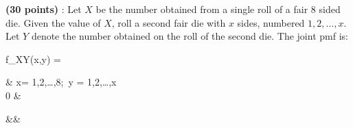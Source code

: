 \documentclass[12pt,letterpaper]{exam}
\begin{document}
\begin{questions}
	\question 
	\textbf{(30 points)} : Let \(X\) be the number obtained from a single roll of a fair 8 sided die.
	Given the value of \(X\), roll a second fair die with \(x\) sides, numbered \(1,2,\ldots,x\).
	Let \(Y\) denote the number obtained on the roll of the second die.
	The joint pmf is:
	\begin{flalign*} \qquad
		f_{XY}(x,y) = \begin{cases}
			 & x= 1,2,\ldots,8;\ y = 1,2,\ldots,x \\
			0 & 
		\end{cases} &&
	\end{flalign*}
	
	
	\begin{solution}
		
	\end{solution}
		

\end{questions}
\end{document}
